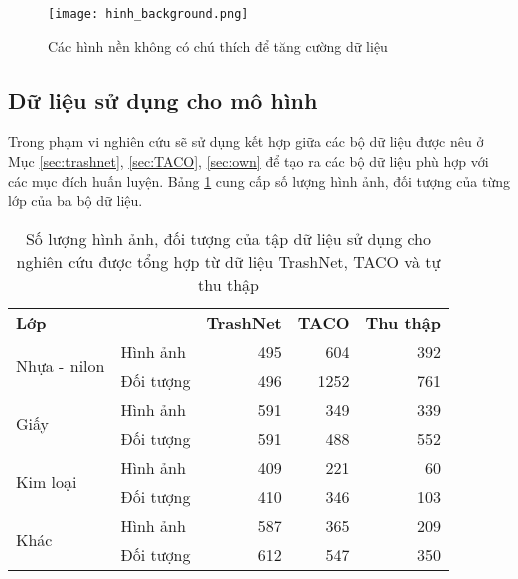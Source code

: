 \documentclass[../the.tex]{subfiles}
\begin{document}
\begin{figure}[H]
	\centering
	\texttt{[image: hinh\_background.png]}
	\caption{Các hình nền không có chú thích để tăng cường dữ liệu}
	\label{fig:dataset_bg}
\end{figure}

\subsection{Dữ liệu sử dụng cho mô hình}
{\fontsize{13}{12} \selectfont

	Trong phạm vi nghiên cứu sẽ sử dụng kết hợp giữa các bộ dữ liệu được nêu ở Mục \ref{sec:trashnet}, \ref{sec:TACO}, \ref{sec:own} để tạo ra các bộ dữ liệu phù hợp với các mục đích huấn luyện.
	Bảng \ref{tab:datasetmain} cung cấp số lượng hình ảnh, đối tượng của từng lớp của ba bộ dữ liệu.

}


\begin{table}[h]
	\centering
	\begin{threeparttable}
		\caption{Số lượng hình ảnh, đối tượng của tập dữ liệu sử dụng cho nghiên cứu được tổng hợp từ dữ liệu TrashNet, TACO và tự thu thập}
		\begin{tabular}{llrrr}
			\cline{1-5}
			\textbf{Lớp}                           &            & \textbf{TrashNet} & \textbf{TACO} & \textbf{Thu thập} \\ \cline{1-5}
			\multirow{2}{*}{Nhựa - nilon} & Hình ảnh   & 495               & 604           & 392               \\ \cline{2-5}
			                                       & Đối tượng  & 496               & 1252          & 761               \\ \cline{1-5}
			\multirow{2}{*}{Giấy}         & Hình ảnh   & 591               & 349           & 339               \\ \cline{2-5}
			                                       & Đối tượng  & 591               & 488           & 552               \\ \cline{1-5}
			\multirow{2}{*}{Kim loại}     & Hình ảnh   & 409               & 221           & 60                \\ \cline{2-5}
			                                       & Đối tượng  & 410               & 346           & 103               \\ \cline{1-5}
			\multirow{2}{*}{Khác}         & Hình   ảnh & 587               & 365           & 209               \\ \cline{2-5}
			                                       & Đối tượng  & 612               & 547           & 350               \\ \cline{1-5}
		\end{tabular}
		\label{tab:datasetmain}
	\end{threeparttable}
\end{table}
\end{document}
